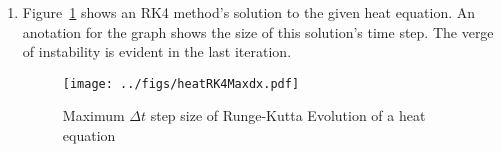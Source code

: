 \documentclass[12pt,a4]{article}
\begin{document}
\begin{enumerate}
\begin{enumerate}
    \end{enumerate}
  \item
    Figure~\ref{fig:heatRK4Maxdx} shows an RK4 method's solution to the given heat equation.
    An anotation for the graph shows the size of this solution's time step.
    The verge of instability is evident in the last iteration.
    \begin{figure}[H]
      \centering
      \texttt{[image: ../figs/heatRK4Maxdx.pdf]}
      \caption{Maximum $\Delta t$ step size of Runge-Kutta Evolution of a heat equation}
      \label{fig:heatRK4Maxdx}
    \end{figure}
\end{enumerate}
\end{document}

